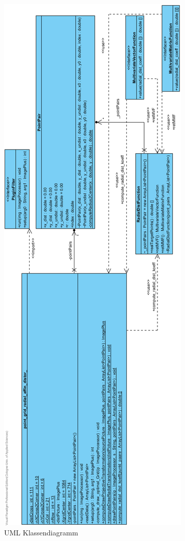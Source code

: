 \begin{figure}[H]
	\center
	\includegraphics[height=\textheight]{Images/Class Diagram1.png}
	\caption{UML Klassendiagramm}
	\label{img:UML}
\end{figure}
